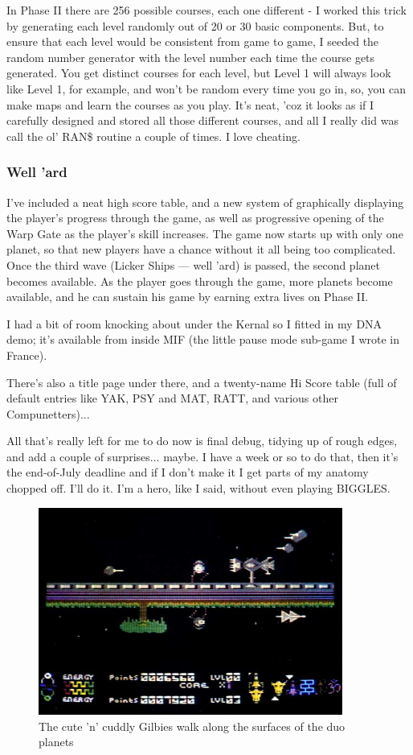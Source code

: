 In Phase II there are 256 possible courses, each one different - I worked this trick by generating each level randomly out of 20 or 30 basic components. But, to ensure that each level would be consistent from game to game, I seeded the random number generator with the level number each time the course gets generated. You get distinct courses for each level, but Level 1 will always look like Level 1, for example, and won't be random every time you go in, so, you can make maps and learn the courses as you play. It's neat, 'coz it looks as if I carefully designed and stored all those different courses, and all I really did was call the ol' RAN\$ routine a couple of times. I love cheating.

\subsubsection{Well 'ard}
I've included a neat high score table, and a new system of graphically displaying the player's progress through the game, as well as progressive opening of the Warp Gate as the player's skill increases. The game now starts up with only one planet, so that new players have a chance without it all being too complicated. Once the third wave (Licker Ships — well 'ard) is passed, the second planet becomes available. As the player goes through the game, more planets become available, and he can sustain his game by earning extra lives on Phase II.

I had a bit of room knocking about under the Kernal so I fitted in my DNA demo; it's available from inside MIF (the little pause mode sub-game I wrote in France).

There's also a title page under there, and a twenty-name Hi Score table (full of default entries like YAK, PSY and MAT, RATT, and various other Compunetters)...

All that's really left for me to do now is final debug, tidying up of rough edges, and add a couple of surprises... maybe. I have a week or so to do that, then it's the end-of-July deadline and if I don't make it I get parts of my anatomy chopped off. I'll do it. I'm a hero, like I said, without even playing BIGGLES.

\begin{figure}[H]
    \centering
      \includegraphics[width=10cm]{src/diary/zzap17_pic2.jpg}%
\caption{
The cute 'n' cuddly Gilbies walk along the surfaces of the duo planets
}
\end{figure}

